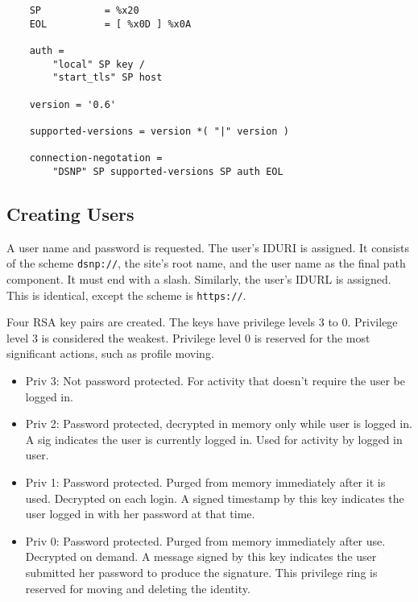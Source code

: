 \documentclass[letterpaper,11pt,oneside]{article}
\begin{document}
\vspace{10pt}
\begin{verbatim}
    SP           = %x20
    EOL          = [ %x0D ] %x0A

    auth = 
        "local" SP key /
        "start_tls" SP host

    version = '0.6'

    supported-versions = version *( "|" version )

    connection-negotation = 
        "DSNP" SP supported-versions SP auth EOL
\end{verbatim}
\vspace{10pt}

\subsection{Creating Users}

A user name and password is requested. The user's IDURI is assigned. It
consists of the scheme \verb'dsnp://', the site's root name, and the user name
as the final path component. It must end with a slash. Similarly, the user's
IDURL is assigned. This is identical, except the scheme is \verb'https://'.

%
%

Four RSA key pairs are created. The keys have privilege levels 3 to 0.
Privilege level 3 is considered the weakest. Privilege level 0 is reserved for
the most significant actions, such as profile moving.

\begin{itemize}
\item Priv 3: Not password protected. For activity that doesn't require the user be logged
in.

\item Priv 2: Password protected, decrypted in memory only while user is logged
in. A sig indicates the user is currently logged in. Used for activity by
logged in user.

\item Priv 1: Password protected. Purged from memory immediately after it is
used. Decrypted on each login. A signed timestamp by this key indicates the
user logged in with her password at that time.

\item Priv 0: Password protected. Purged from memory immediately after use.
Decrypted on demand. A message signed by this key indicates the user submitted
her password to produce the signature. This privilege ring is reserved for
moving and deleting the identity.
\end{itemize}
\end{document}
